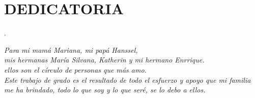 \chapter*{DEDICATORIA}

 \begin{flushright}.
 
\textit{
Para mi mamá Mariana, mi papá Hanssel,\\ 
mis hermanas  María Silvana, Katherin y mi hermano Enrrique.\\
ellos son el círculo de personas que más amo.\\
Este trabajo de grado es el resultado de todo el esfuerzo y apoyo que mi familia me ha brindado, todo lo que soy y lo que seré, se lo debo a ellos.}
\end{flushright}



